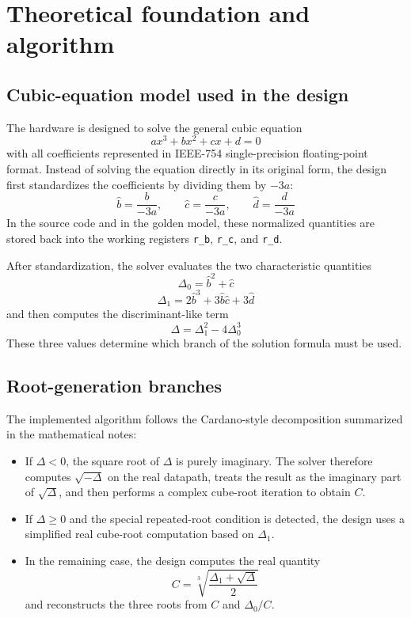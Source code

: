 \section{Theoretical foundation and algorithm}

\subsection{Cubic-equation model used in the design}

The hardware is designed to solve the general cubic equation
\begin{equation}
ax^3 + bx^2 + cx + d = 0
\end{equation}
with all coefficients represented in IEEE-754 single-precision floating-point format. Instead of solving the equation directly in its original form, the design first standardizes the coefficients by dividing them by $-3a$:
\begin{equation}
\hat{b} = \frac{b}{-3a}, \qquad
\hat{c} = \frac{c}{-3a}, \qquad
\hat{d} = \frac{d}{-3a}
\end{equation}
In the source code and in the golden model, these normalized quantities are stored back into the working registers \texttt{r\_b}, \texttt{r\_c}, and \texttt{r\_d}.

After standardization, the solver evaluates the two characteristic quantities
\begin{equation}
\Delta_0 = \hat{b}^2 + \hat{c}
\end{equation}
\begin{equation}
\Delta_1 = 2\hat{b}^3 + 3\hat{b}\hat{c} + 3\hat{d}
\end{equation}
and then computes the discriminant-like term
\begin{equation}
\Delta = \Delta_1^2 - 4\Delta_0^3
\end{equation}
These three values determine which branch of the solution formula must be used.

\subsection{Root-generation branches}

The implemented algorithm follows the Cardano-style decomposition summarized in the mathematical notes:
\begin{itemize}
    \item If $\Delta < 0$, the square root of $\Delta$ is purely imaginary. The solver therefore computes $\sqrt{-\Delta}$ on the real datapath, treats the result as the imaginary part of $\sqrt{\Delta}$, and then performs a complex cube-root iteration to obtain $C$.
    \item If $\Delta \ge 0$ and the special repeated-root condition is detected, the design uses a simplified real cube-root computation based on $\Delta_1$.
    \item In the remaining case, the design computes the real quantity
    \begin{equation}
        C = \sqrt[3]{\frac{\Delta_1 + \sqrt{\Delta}}{2}}
    \end{equation}
    and reconstructs the three roots from $C$ and $\Delta_0/C$.
\end{itemize}

